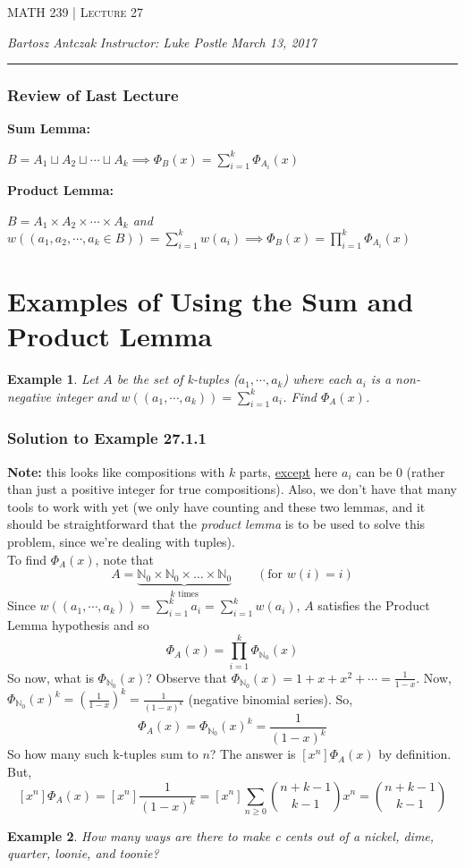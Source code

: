 \documentclass{report}
\newcommand{\lectureNum}{27}
\newcommand{\curDate}{March 13, 2017}
\newcommand{\course}{MATH 239}
\newcommand{\instructor}{Luke Postle}
\newtheorem{ex}{Example}[section]
\begin{document}
\begin{center}
\begin{Large}
\textsc{\course{} | Lecture \lectureNum{}}
\end{Large}
\end{center} 
\noindent \textit{Bartosz Antczak} \hfill
\textit{Instructor: \instructor{}} \hfill
\textit{\curDate{}}
\rule{\textwidth}{0.4pt}
\subsubsection{Review of Last Lecture}
\textbf{Sum Lemma:} 
\begin{center}
\textit{$B = A_1 \sqcup A_2 \sqcup \cdots \sqcup A_k \implies \Phi_B(x) = \displaystyle\sum_{i=1}^k \Phi_{A_i}(x)$}
\end{center}
\textbf{Product Lemma:}
\begin{center}
\textit{$B = A_1 \times A_2 \times \cdots \times A_k$ and $w((a_1, a_2, \cdots, a_k \in B)) = \displaystyle\sum_{i=1}^k w(a_i) \implies \Phi_B(x) = \displaystyle\prod_{i=1}^k \Phi_{A_i}(x)$}
\end{center}
\section{Examples of Using the Sum and Product Lemma}
\begin{ex}
Let $A$ be the set of k-tuples ($a_1, \cdots, a_k$) where each $a_i$ is a non-negative integer and $w((a_1, \cdots, a_k)) = \displaystyle\sum_{i=1}^k a_i$. Find $\Phi_{A}(x)$.
\end{ex}
\subsubsection{Solution to Example 27.1.1}
\textbf{Note:} this looks like compositions with $k$ parts, \underline{except} here $a_i$ can be 0 (rather than just a positive integer for true compositions). Also, we don't have that many tools to work with yet (we only have counting and these two lemmas, and it should be straightforward that the \textit{product lemma} is to be used to solve this problem, since we're dealing with tuples).\\
To find $\Phi_{A}(x)$, note that
$$A = \underbrace{\mathbb{N}_0 \times \mathbb{N}_0 \times \ldots \times \mathbb{N}_0}_{k \text{ times}} \qquad (\text{for } w(i) = i)$$
Since $w((a_1, \cdots, a_k)) = \sum_{i=1}^k a_i = \sum_{i=1}^k w(a_i)$, $A$ satisfies the Product Lemma hypothesis and so
$$\Phi_A(x) = \displaystyle\prod_{i=1}^k \Phi_{\mathbb{N}_0}(x)$$
So now, what is $\Phi_{\mathbb{N}_0}(x)$? Observe that $\Phi_{\mathbb{N}_0}(x) = 1 + x + x^2 + \cdots = \frac{1}{1-x}$. Now, $\Phi_{\mathbb{N}_0}(x)^k = (\frac{1}{1-x})^k = \frac{1}{(1-x)^k}$ (negative binomial series). So,
$$\Phi_{A}(x) = \Phi_{\mathbb{N}_0}(x)^k = \frac{1}{(1-x)^k}$$
So how many such k-tuples sum to $n$? The answer is $[x^n]\Phi_{A}(x)$ by definition. But,
$$[x^n]\Phi_{A}(x) = [x^n]\frac{1}{(1-x)^k} = [x^n]\sum_{n \geq 0}{n+k-1 \choose k-1}x^n = {n+k-1 \choose k-1}$$
\newpage
\begin{ex}
How many ways are there to make c cents out of a nickel, dime, quarter, loonie, and toonie?
\end{ex}
\end{document}
